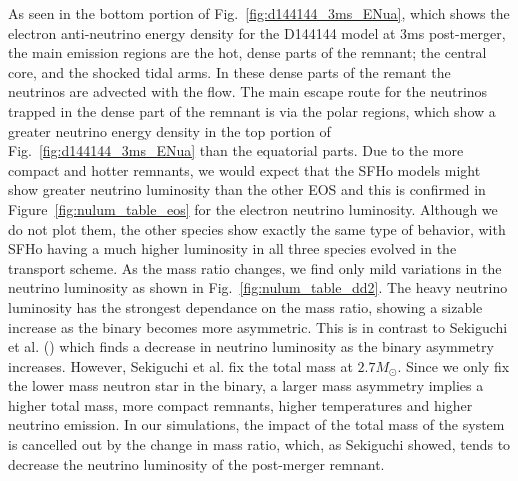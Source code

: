 As seen in the bottom portion of Fig.~\ref{fig:d144144_3ms_ENua}, which shows the electron anti-neutrino energy density for the D144144 model at 3ms post-merger, the main emission regions are the hot, dense parts of the remnant; the central core, and the shocked tidal arms. In these dense parts of the remant the neutrinos are advected with the flow. The 
main escape route for the neutrinos trapped in the dense part of the remnant is via the polar regions,
which show a greater neutrino energy density in the top portion of Fig.~\ref{fig:d144144_3ms_ENua} than the equatorial parts. Due to the more compact and hotter remnants, we would expect that the SFHo models might show greater neutrino luminosity than the other EOS and this is confirmed in Figure~\ref{fig:nulum_table_eos} for the electron neutrino luminosity. Although we do not plot them, the other species show exactly the same type of behavior, with SFHo having a much higher luminosity in all three species evolved in the transport scheme.
%
As the mass ratio changes, we find only mild variations in the neutrino luminosity as shown in Fig.~\ref{fig:nulum_table_dd2}. The heavy neutrino luminosity has the strongest 
dependance on the mass ratio, showing a sizable increase as the %
binary becomes more asymmetric. This is in contrast to Sekiguchi et al. (\citet*{sekiguchi:2016}) which finds a decrease in neutrino luminosity as the binary asymmetry increases. However, Sekiguchi et al. fix the total mass at $2.7M_\odot$. Since we only fix the lower mass neutron star in the binary, 
a larger mass asymmetry implies a higher total mass, more compact remnants, higher temperatures and higher neutrino emission. 
In our simulations, the impact of the total mass of the system is cancelled out by the 
change in mass ratio, which, as Sekiguchi showed, tends to decrease the neutrino luminosity of the post-merger remnant. 
%

